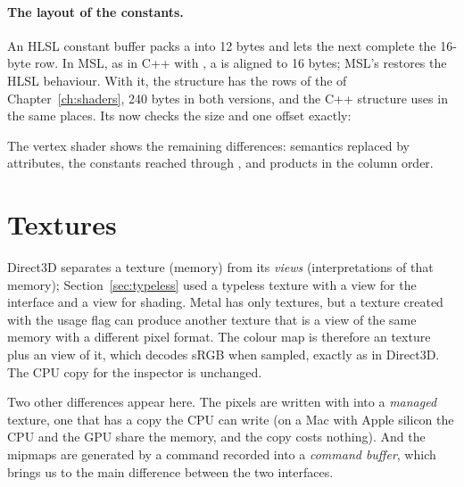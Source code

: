 
\paragraph{The layout of the constants.} An HLSL constant buffer packs a  into 12
bytes and lets the next  complete the 16-byte row. In MSL, as in C++ with
, a  is aligned to 16 bytes; MSL's  restores the
HLSL behaviour. With it, the structure has the rows of the  of
Chapter~\ref{ch:shaders}, 240 bytes in both versions, and the C++ structure uses  in
the same places. Its  now checks the size and one offset exactly:



The vertex shader shows the remaining differences: semantics replaced by attributes, the
constants reached through , and products in the column order.


\section{Textures}
\label{sec:mactextures}
Direct3D separates a texture (memory) from its \emph{views} (interpretations of that memory);
Section~\ref{sec:typeless} used a typeless texture with a  view for the interface and
a  view for shading. Metal has only textures, but a texture created with the
usage flag  can produce another texture that is a view of the same memory
with a different pixel format. The colour map is therefore an  texture plus an
 view of it, which decodes sRGB when sampled, exactly as in Direct3D.
The CPU copy for the inspector is unchanged.


Two other differences appear here. The pixels are written with  into a
\emph{managed} texture, one that has a copy the CPU can write (on a Mac with Apple silicon the
CPU and the GPU share the memory, and the copy costs nothing). And the mipmaps are generated by
a command recorded into a \emph{command buffer}, which brings us to the main difference between
the two interfaces.


